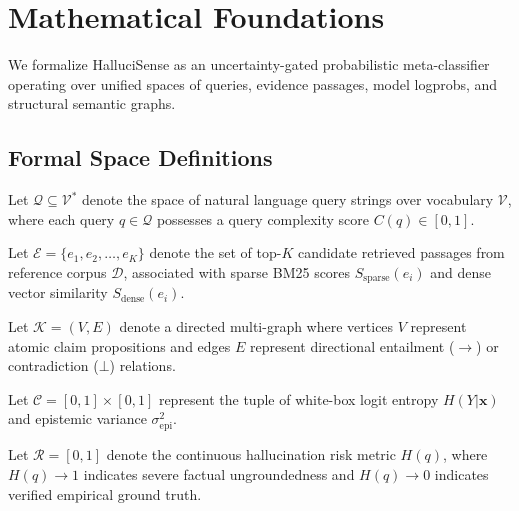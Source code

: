 \section{Mathematical Foundations}
\label{sec:math_foundations}

We formalize HalluciSense as an uncertainty-gated probabilistic meta-classifier operating over unified spaces of queries, evidence passages, model logprobs, and structural semantic graphs.

\subsection{Formal Space Definitions}

\begin{definition}
Let $\mathcal{Q} \subseteq \mathcal{V}^*$ denote the space of natural language query strings over vocabulary $\mathcal{V}$, where each query $q \in \mathcal{Q}$ possesses a query complexity score $C(q) \in [0, 1]$.
\end{definition}

\begin{definition}
Let $\mathcal{E} = \{e_1, e_2, \dots, e_K\}$ denote the set of top-$K$ candidate retrieved passages from reference corpus $\mathcal{D}$, associated with sparse BM25 scores $S_{\text{sparse}}(e_i)$ and dense vector similarity $S_{\text{dense}}(e_i)$.
\end{definition}

\begin{definition}
Let $\mathcal{K} = (V, E)$ denote a directed multi-graph where vertices $V$ represent atomic claim propositions and edges $E$ represent directional entailment ($\to$) or contradiction ($\bot$) relations.
\end{definition}

\begin{definition}
Let $\mathcal{C} = [0, 1] \times [0, 1]$ represent the tuple of white-box logit entropy $H(Y|\mathbf{x})$ and epistemic variance $\sigma_{\text{epi}}^2$.
\end{definition}

\begin{definition}
Let $\mathcal{R} = [0, 1]$ denote the continuous hallucination risk metric $H(q)$, where $H(q) \to 1$ indicates severe factual ungroundedness and $H(q) \to 0$ indicates verified empirical ground truth.
\end{definition}

